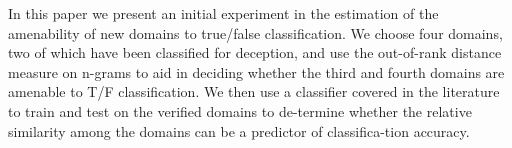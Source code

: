 In this paper we present an initial experiment in the estimation of the amenability of new domains to true/false classification. We choose four domains, two of which have been classified for deception, and use the out-of-rank distance measure on n-grams to aid in deciding whether the third and fourth domains are amenable to T/F classification. We then use a classifier covered in the literature to train and test on the verified domains to de-termine whether the relative similarity among the domains can be a predictor of classifica-tion accuracy.
